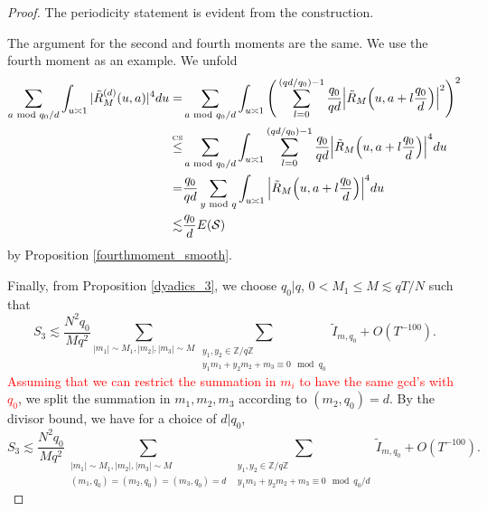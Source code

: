 \begin{proof}
    The periodicity statement is evident from the construction. 

    The argument for the second and fourth moments are the same. We use the fourth moment as an example. We unfold \begin{align*}
        \sum_{a\mod q_0/d} \int_{u\asymp 1 }|\tilde{R}^{(d)}_M(u,a)|^4 du=&
        \sum_{a\mod q_0/d} \int_{u\asymp 1 }
        \Bigg(\sum_{l=0}^{(qd/q_0)-1} \frac{q_0}{qd} \Big|\tilde{R}_M\Big(u,a + l \frac{q_0}{d}\Big)\Big|^2\Bigg)^{2}\\
        \stackon{CS}{\leq}&\sum_{a\mod q_0/d} \int_{u\asymp 1 }
        \sum_{l=0}^{(qd/q_0)-1} \frac{q_0}{qd} \Big|\tilde{R}_M\Big(u,a + l \frac{q_0}{d}\Big)\Big|^4 du\\
        =& \frac{q_0}{qd} \sum_{y\mod q}\int_{u\asymp 1}\Big|\tilde{R}_M\Big(u,a + l \frac{q_0}{d}\Big)\Big|^4 du\\
        \lesssim& \frac{q_0}{d}E(\mathcal{S})
    \end{align*}
    by Proposition \ref{fourthmoment_smooth}.


    Finally, from Proposition \ref{dyadics_3}, we choose $q_0|q$, $0<M_1\leq M\lesssim qT/N$ such that
    \[
        S_3\lesssim \frac{N^2q_0}{Mq^2}\sum_{|m_1|\sim M_1,|m_2|,|m_3|\sim M}\sum_{\substack{y_1,y_2 \in\mathbb{Z}/q\mathbb{Z} \\ y_1m_1+y_2m_2+m_3\equiv 0 \mod q_0}}\tilde{I}_{m,q_0}+O(T^{-100}).
    \]
    \textcolor{red}{Assuming that we can restrict the summation in $m_i$ to have the same gcd's with $q_0$}, we split the summation in $m_1,m_2,m_3$ according to $(m_2,q_0)=d$. By the divisor bound, we have for a choice of $d|q_0$,
     \[
        S_3\lesssim \frac{N^2q_0}{Mq^2}\sum_{\substack{|m_1|\sim M_1,|m_2|,|m_3|\sim M\\
        (m_1,q_0)=(m_2,q_0)=(m_3,q_0)=d}}\sum_{\substack{y_1,y_2 \in\mathbb{Z}/q\mathbb{Z} \\ y_1m_1+y_2m_2+m_3\equiv 0 \mod q_0/d}}\tilde{I}_{m,q_0}+O(T^{-100}).
    \]
    

\end{proof}

